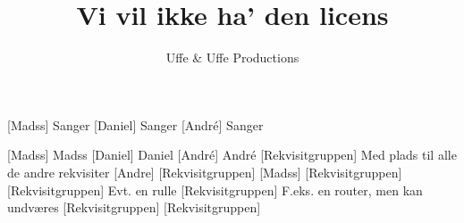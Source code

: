 \documentclass[a4paper,11pt]{article}
\title{Vi vil ikke ha' den licens}
\author{Uffe \& Uffe Productions\texttrademark}
\begin{document}
\maketitle

\begin{roles}  
[Madss] Sanger
[Daniel] Sanger
[André] Sanger
\end{roles}

\begin{props}
[Madss] Madss
[Daniel] Daniel
[André] André
[Rekvisitgruppen] Med plads til alle de andre rekvisiter
[Andre]
[Rekvisitgruppen]
[Madss]
[Rekvisitgruppen]
[Rekvisitgruppen] Evt. en rulle
[Rekvisitgruppen] F.eks. en router, men kan undværes
[Rekvisitgruppen]
[Rekvisitgruppen]
\end{props}
\end{document}
